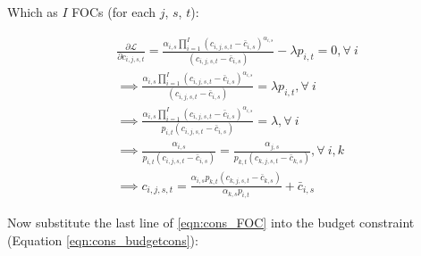     Which as $I$ FOCs (for each $j$, $s$, $t$):
    
      \begin{equation} \label{eqn:cons_FOC}
      \begin{split}
       & \frac{\partial \mathcal{L}}{\partial c_{i,j,s,t}} = \frac{\alpha_{i,s} \prod_{i=1}^I \left( c_{i,j,s,t} - \bar c_{i,s} \right) ^{\alpha_{i,s}}}{(c_{i,j,s,t}-\bar{c}_{i,s})}-\lambda p_{i,t} = 0, \forall \ i  \\
       & \implies  \frac{\alpha_{i,s} \prod_{i=1}^I \left( c_{i,j,s,t} - \bar c_{i,s} \right) ^{\alpha_{i,s}}}{(c_{i,j,s,t}-\bar{c}_{i,s})} = \lambda p_{i,t}, \forall \ i \\
       & \implies  \frac{\alpha_{i,s} \prod_{i=1}^I \left( c_{i,j,s,t} - \bar c_{i,s} \right) ^{\alpha_{i,s}}}{ p_{i,t}(c_{i,j,s,t}-\bar{c}_{i,s})} = \lambda, \forall \ i \\
       & \implies \frac{\alpha_{i,s}}{p_{i,t}(c_{i,j,s,t}-\bar{c}_{i,s})}=\frac{\alpha_{j,s}}{p_{k,t}(c_{k,j,s,t}-\bar{c}_{k,s})}, \forall \ i,k \\
       & \implies c_{i,j,s,t}= \frac{\alpha_{i,s} p_{k,t}(c_{k,j,s,t}-\bar{c}_{k,s})}{\alpha_{k,s} p_{i,t}} + \bar{c}_{i,s}
       \end{split}
    \end{equation}
    
    Now substitute the last line of \ref{eqn:cons_FOC} into the budget constraint (Equation \ref{eqn:cons_budgetcons}):
    
